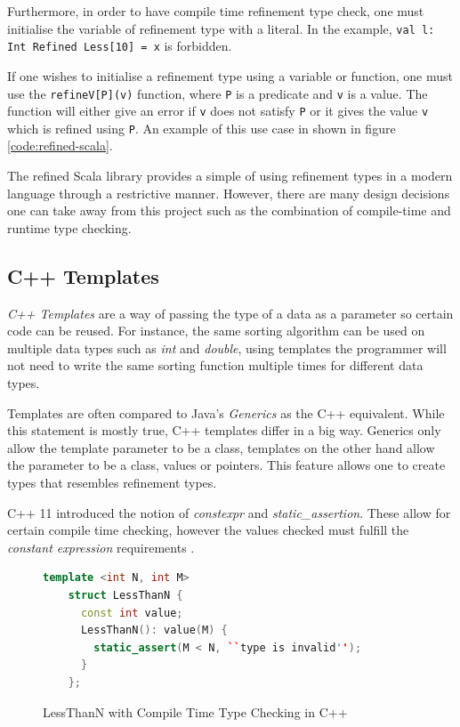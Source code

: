 \documentclass[a4paper,12pt]{report}
\begin{document}
\par
Furthermore, in 
order to have compile time refinement type check, one must initialise the 
variable of refinement type with a literal. In the example, 
\verb|val l: Int Refined Less[10] = x| is forbidden. 

\par
If one wishes to initialise a refinement type using a variable or function, one 
must use the \verb|refineV[P](v)| function, where \verb|P| is a predicate and 
\verb|v| is a value. The function will either give an error if \verb|v| does not 
satisfy \verb|P| or it gives the value \verb|v| which is refined using \verb|P|. 
An example of this use case in shown in figure \ref{code:refined-scala}.

\par
The refined Scala library provides a simple of using refinement types in a modern 
language through a restrictive manner. However, there are many design decisions 
one can take away from this project such as the combination of compile-time and 
runtime type checking. 


\subsection{C++ Templates}
\textit{C++ Templates} \cite{cppTemplate} are a way of passing the type of a 
data as a parameter so certain code can be reused. For instance, the same 
sorting algorithm can be used on multiple data types such as \textit{int} and 
\textit{double}, using templates the programmer will not need to write the same 
sorting function multiple times for different data types. 

\par
Templates are often compared to Java's \textit{Generics} \cite{javaGenerics} 
as the C++ equivalent. While this statement is mostly true, C++ templates 
differ in a big way. 
Generics only allow the template parameter to be a class, templates on the other 
hand allow the parameter to be a class, values or pointers. This feature allows 
one to create types that resembles refinement types. 

\par
C++ 11 introduced the notion of 
\textit{constexpr} and \textit{static\_assertion}. These allow for certain 
compile time checking, however the values checked must fulfill 
the \textit{constant expression} requirements \cite{cppConstExpr}. 

\begin{figure}[H]
  \begin{lstlisting}[language=c++]     
    template <int N, int M>
    struct LessThanN {
      const int value;
      LessThanN(): value(M) {
        static_assert(M < N, ``type is invalid'');
      }
    };
  \end{lstlisting}
  \caption{LessThanN with Compile Time Type Checking in C++}
  \label{code:compileLTN}
\end{figure}
\end{document}
